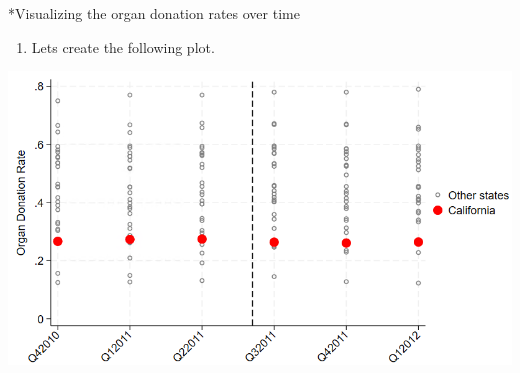 \documentclass[notes,11pt, aspectratio=169]{beamer}
\begin{document}
\begin{frame}{*Visualizing the organ donation rates over time}
\begin{enumerate}
    \item Lets create the following plot.
\end{enumerate}
 \begin{center}
        \includegraphics[width=0.7\linewidth]{24_DiDLecture/24_DiDLecture_PlotAll.png}
    \end{center}
\end{frame}
\end{document}
